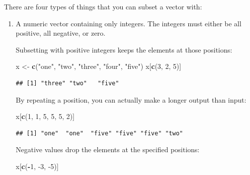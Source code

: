 \documentclass[
]{book}
\newenvironment{Shaded}{\begin{snugshade}}{\end{snugshade}}
\newcommand{\DecValTok}[1]{\textcolor[rgb]{0.00,0.00,0.81}{#1}}
\newcommand{\KeywordTok}[1]{\textcolor[rgb]{0.13,0.29,0.53}{\textbf{#1}}}
\newcommand{\NormalTok}[1]{#1}
\newcommand{\OperatorTok}[1]{\textcolor[rgb]{0.81,0.36,0.00}{\textbf{#1}}}
\newcommand{\StringTok}[1]{\textcolor[rgb]{0.31,0.60,0.02}{#1}}
\begin{document}
There are four types of things that you can subset a vector with:

\begin{enumerate}
\def\labelenumi{\arabic{enumi}.}
\item
  A numeric vector containing only integers.
  The integers must either be all positive, all negative, or zero.

  Subsetting with positive integers keeps the elements at those positions:

\begin{Shaded}
\begin{Highlighting}[]
\NormalTok{x <-}\StringTok{ }\KeywordTok{c}\NormalTok{(}\StringTok{"one"}\NormalTok{, }\StringTok{"two"}\NormalTok{, }\StringTok{"three"}\NormalTok{, }\StringTok{"four"}\NormalTok{, }\StringTok{"five"}\NormalTok{)}
\NormalTok{x[}\KeywordTok{c}\NormalTok{(}\DecValTok{3}\NormalTok{, }\DecValTok{2}\NormalTok{, }\DecValTok{5}\NormalTok{)]}
\end{Highlighting}
\end{Shaded}

\begin{verbatim}
## [1] "three" "two"   "five"
\end{verbatim}

  By repeating a position, you can actually make a longer output than input:

\begin{Shaded}
\begin{Highlighting}[]
\NormalTok{x[}\KeywordTok{c}\NormalTok{(}\DecValTok{1}\NormalTok{, }\DecValTok{1}\NormalTok{, }\DecValTok{5}\NormalTok{, }\DecValTok{5}\NormalTok{, }\DecValTok{5}\NormalTok{, }\DecValTok{2}\NormalTok{)]}
\end{Highlighting}
\end{Shaded}

\begin{verbatim}
## [1] "one"  "one"  "five" "five" "five" "two"
\end{verbatim}

  Negative values drop the elements at the specified positions:

\begin{Shaded}
\begin{Highlighting}[]
\NormalTok{x[}\KeywordTok{c}\NormalTok{(}\OperatorTok{-}\DecValTok{1}\NormalTok{, }\DecValTok{-3}\NormalTok{, }\DecValTok{-5}\NormalTok{)]}
\end{Highlighting}
\end{Shaded}


\end{enumerate}
\end{document}
